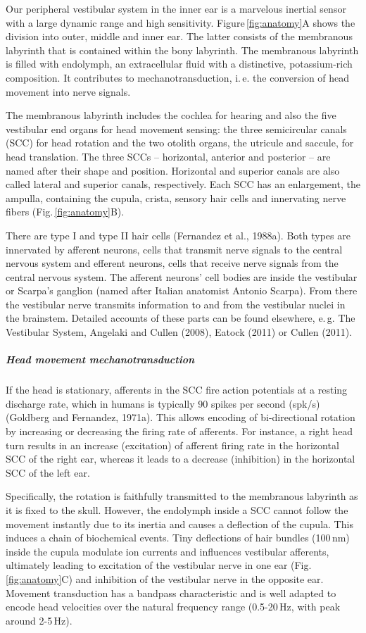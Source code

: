 Our peripheral vestibular system in the inner ear is a marvelous inertial sensor with a large dynamic range and high sensitivity. Figure\,\ref{fig:anatomy}A shows the division into outer, middle and inner ear. The latter consists of the membranous labyrinth that is contained within the bony labyrinth. The membranous labyrinth is filled with endolymph, an extracellular fluid with a distinctive, potassium-rich composition. It contributes to mechanotransduction, i.\,e. the conversion of head movement into nerve signals.

The membranous labyrinth includes the cochlea for hearing and also the five vestibular end organs for head movement sensing: the three semicircular canals (SCC) for head rotation and the two otolith organs, the utricule and saccule, for head translation. The three SCCs -- horizontal, anterior and posterior -- are named after their shape and position. Horizontal and superior canals are also called lateral and superior canals, respectively. Each SCC has an enlargement, the ampulla, containing the cupula, crista, sensory hair cells and innervating nerve fibers (Fig.\,\ref{fig:anatomy}B). 

There are type I and type II hair cells (Fernandez et al., 1988a). Both types are innervated by afferent neurons, cells that transmit nerve signals to the central nervous system and efferent neurons, cells that receive nerve signals from the central nervous system. The afferent neurons' cell bodies are inside the vestibular or Scarpa's ganglion (named after Italian anatomist Antonio Scarpa). From there the vestibular nerve transmits information to and from the vestibular nuclei in the brainstem. Detailed accounts of these parts can be found elsewhere, e.\,g. The Vestibular System, Angelaki and Cullen (2008), Eatock (2011) or Cullen (2011).
 
\subparagraph{Head movement mechanotransduction}
If the head is stationary, afferents in the SCC fire action potentials at a resting discharge rate, which in humans is typically 90 spikes per second (spk/s) (Goldberg and Fernandez, 1971a). This allows encoding of bi-directional rotation by increasing or decreasing the firing rate of afferents. For instance, a right head turn results in an increase (excitation) of afferent firing rate in the horizontal SCC of the right ear, whereas it leads to a decrease (inhibition) in the horizontal SCC of the left ear.

Specifically, the rotation is faithfully transmitted to the membranous labyrinth as it is fixed to the skull. However, the endolymph inside a SCC cannot follow the movement instantly due to its inertia and causes a deflection of the cupula. This induces a chain of biochemical events. Tiny deflections of hair bundles (100\,nm) inside the cupula modulate ion currents and influences vestibular afferents, ultimately leading to excitation of the vestibular nerve in one ear (Fig.\,\ref{fig:anatomy}C) and inhibition of the vestibular nerve in the opposite ear. Movement transduction has a bandpass characteristic and is well adapted to encode head velocities over the natural frequency range (0.5-20\,Hz, with peak around 2-5\,Hz).

